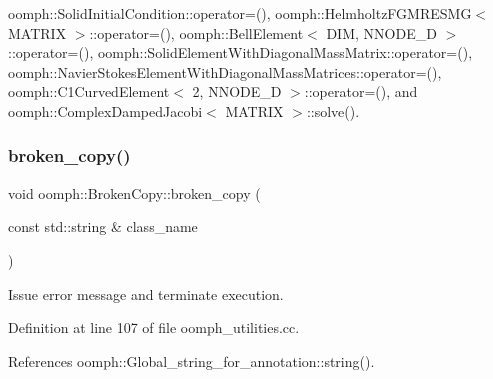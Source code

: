 oomph\+::\+Solid\+Initial\+Condition\+::operator=(), oomph\+::\+Helmholtz\+F\+G\+M\+R\+E\+S\+M\+G$<$ M\+A\+T\+R\+I\+X $>$\+::operator=(), oomph\+::\+Bell\+Element$<$ D\+I\+M, N\+N\+O\+D\+E\+\_\+D $>$\+::operator=(), oomph\+::\+Solid\+Element\+With\+Diagonal\+Mass\+Matrix\+::operator=(), oomph\+::\+Navier\+Stokes\+Element\+With\+Diagonal\+Mass\+Matrices\+::operator=(), oomph\+::\+C1\+Curved\+Element$<$ 2, N\+N\+O\+D\+E\+\_\+D $>$\+::operator=(), and oomph\+::\+Complex\+Damped\+Jacobi$<$ M\+A\+T\+R\+I\+X $>$\+::solve().

\mbox{\label{namespaceoomph_1_1BrokenCopy_a7e5cd7fda8b8c790003151bee77a84ac}} 
\subsubsection{\texorpdfstring{broken\+\_\+copy()}{broken\_copy()}}
{\footnotesize\ttfamily void oomph\+::\+Broken\+Copy\+::broken\+\_\+copy (\begin{DoxyParamCaption}\item[{const std\+::string \&}]{class\+\_\+name }\end{DoxyParamCaption})}



Issue error message and terminate execution. 



Definition at line 107 of file oomph\+\_\+utilities.\+cc.



References oomph\+::\+Global\+\_\+string\+\_\+for\+\_\+annotation\+::string().



